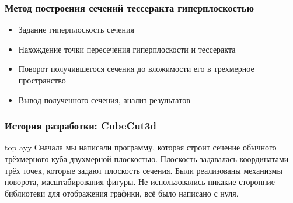 \documentclass[10pt,pdf,hyperref={unicode}]{beamer}
\begin{document}
\begin{frame}
\begin{frame}
\frametitle{Метод построения сечений тессеракта гиперплоскостью}
	\begin{itemize}
		\item Задание гиперплоскость сечения
		\item Нахождение точки пересечения гиперплоскости и тессеракта
		\item Поворот получившегося сечения до вложимости его в трехмерное пространство
		\item Вывод полученного сечения, анализ результатов
	\end{itemize}
\end{frame}

\begin{frame}
\frametitle{История разработки: {\bf CubeCut3d}}
	top ayy	
	Сначала мы написали программу, которая 
	строит сечение обычного трёхмерного куба двухмерной плоскостью.
	Плоскость задавалась координатами трёх точек, которые задают плоскость сечения.
	Были реализованы механизмы поворота, масштабирования фигуры.	
	Не использовались никакие сторонние библиотеки для отображения графики,
	всё было написано с нуля. 
\end{frame}


\end{frame}
\end{document}
